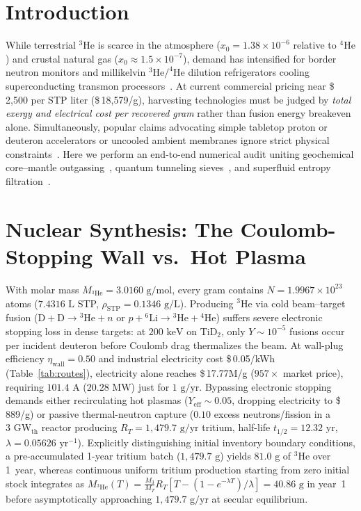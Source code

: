 \documentclass[11pt,a4paper]{article}
\begin{document}
\section{Introduction}
While terrestrial $^3\mathrm{He}$ is scarce in the atmosphere ($x_0 = 1.38 \times 10^{-6}$ relative to $^4\mathrm{He}$) and crustal natural gas ($x_0 \approx 1.5 \times 10^{-7}$), demand has intensified for border neutron monitors and millikelvin $^3\mathrm{He}/^4\mathrm{He}$ dilution refrigerators cooling superconducting transmon processors~\cite{osheroff1972,olivaes2026zne}. At current commercial pricing near \$\,2,500 per STP liter (\$\,18,579/g), harvesting technologies must be judged by \emph{total exergy and electrical cost per recovered gram} rather than fusion energy breakeven alone. Simultaneously, popular claims advocating simple tabletop proton or deuteron accelerators or uncooled ambient membranes ignore strict physical constraints~\cite{olivaes2026book}. Here we perform an end-to-end numerical audit uniting geochemical core--mantle outgassing~\cite{olson2022}, quantum tunneling sieves~\cite{hauser2012}, and superfluid entropy filtration~\cite{niechcial2021}.

\section{Nuclear Synthesis: The Coulomb-Stopping Wall vs.\ Hot Plasma}
With molar mass $M_{^3\mathrm{He}} = 3.0160\text{ g/mol}$, every gram contains $N = 1.9967 \times 10^{23}$ atoms ($7.4316\text{ L}$ STP, $\rho_{\mathrm{STP}} = 0.1346\text{ g/L}$). Producing $^3\mathrm{He}$ via cold beam--target fusion ($\mathrm{D}+\mathrm{D} \to {}^3\mathrm{He}+n$ or $p+{}^6\mathrm{Li} \to {}^3\mathrm{He}+{}^4\mathrm{He}$) suffers severe electronic stopping loss in dense targets: at $200\text{ keV}$ on $\mathrm{TiD}_2$, only $Y \sim 10^{-5}$ fusions occur per incident deuteron before Coulomb drag thermalizes the beam. At wall-plug efficiency $\eta_{\mathrm{wall}} = 0.50$ and industrial electricity cost \$\,0.05/kWh (Table~\ref{tab:routes}), electricity alone reaches \$\,17.77M/g ($957\times$ market price), requiring $101.4\text{ A}$ ($20.28\text{ MW}$) just for $1\text{ g/yr}$. Bypassing electronic stopping demands either recirculating hot plasmas ($Y_{\mathrm{eff}} \sim 0.05$, dropping electricity to \$\,889/g) or passive thermal-neutron capture ($0.10$ excess neutrons/fission in a $3\text{ GW}_{\mathrm{th}}$ reactor producing $R_T = 1{,}479.7\text{ g/yr}$ tritium, half-life $t_{1/2} = 12.32\text{ yr}$, $\lambda = 0.05626\text{ yr}^{-1}$). Explicitly distinguishing initial inventory boundary conditions, a pre-accumulated 1-year tritium batch ($1{,}479.7\text{ g}$) yields $81.0\text{ g}$ of $^3\mathrm{He}$ over 1~year, whereas continuous uniform tritium production starting from zero initial stock integrates as $M_{^3\mathrm{He}}(T) = \frac{M_3}{M_T} R_T [T - (1 - e^{-\lambda T})/\lambda] = 40.86\text{ g}$ in year~1 before asymptotically approaching $1{,}479.7\text{ g/yr}$ at secular equilibrium.
\end{document}
